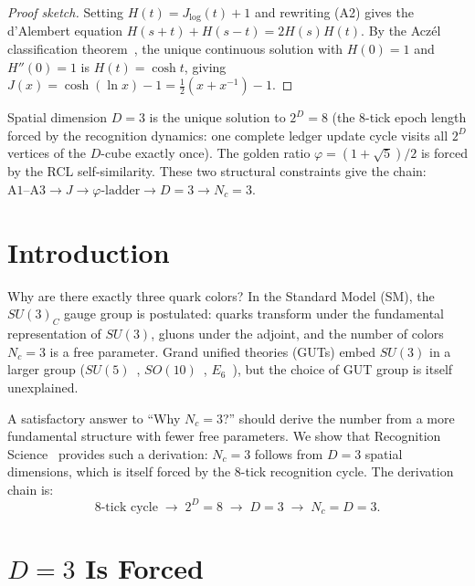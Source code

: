 \documentclass[12pt,a4paper]{article}
\theoremstyle{definition}
\theoremstyle{remark}
\begin{document}
\begin{proof}[Proof sketch]
Setting $H(t) = J_{\log}(t) + 1$ and rewriting \textup{(A2)} gives the
d'Alembert equation $H(s+t) + H(s-t) = 2H(s)H(t)$.  By the Acz\'el
classification theorem~\cite{Aczel1966}, the unique continuous solution
with $H(0) = 1$ and $H''(0) = 1$ is $H(t) = \cosh t$, giving
$J(x) = \cosh(\ln x) - 1 = \tfrac{1}{2}(x + x^{-1}) - 1$.
\end{proof}

\noindent Spatial dimension $D = 3$ is the unique solution to $2^D = 8$
(the 8-tick epoch length forced by the recognition dynamics: one complete
ledger update cycle visits all $2^D$ vertices of the $D$-cube exactly once).
The golden ratio $\varphi = (1+\sqrt{5})/2$ is forced by the RCL self-similarity.
These two structural constraints give the chain:
$\text{A1--A3} \to J \to \varphi\text{-ladder} \to D=3 \to N_c = 3$.

\section{Introduction}
\label{sec:intro}

Why are there exactly three quark colors?  In the Standard Model (SM),
the $SU(3)_C$ gauge group is postulated: quarks transform under the
fundamental representation of $SU(3)$, gluons under the adjoint, and
the number of colors $N_c = 3$ is a free parameter.  Grand unified
theories (GUTs) embed $SU(3)$ in a larger group
($SU(5)$~\cite{Georgi1974}, $SO(10)$~\cite{Fritzsch1975},
$E_6$~\cite{Gursey1976}), but the choice of GUT group is itself
unexplained.

A satisfactory answer to ``Why $N_c = 3$?'' should derive the number
from a more fundamental structure with fewer free parameters.  We show
that Recognition Science~\cite{RS_Axioms} provides such a derivation:
$N_c = 3$ follows from $D = 3$ spatial dimensions, which is itself
forced by the 8-tick recognition cycle.  The derivation chain is:
\begin{equation}
  \text{8-tick cycle} \;\longrightarrow\; 2^D = 8
  \;\longrightarrow\; D = 3
  \;\longrightarrow\; N_c = D = 3.
\end{equation}

\section{$D = 3$ Is Forced}
\label{sec:dimension}
\end{document}

